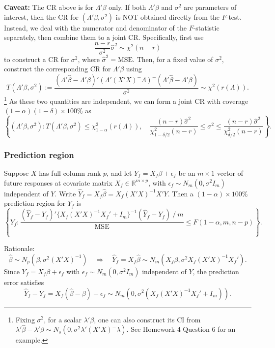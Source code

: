 \documentclass{article}
\theoremstyle{break}
\newcommand{\R}{\ensuremath{\mathbb{R}}}
\begin{document}
\textbf{Caveat:} The CR above is for $\Lambda'\beta$ only. If both $\Lambda'\beta$ and $\sigma^2$ are parameters of interest, then the CR for $(\Lambda'\beta,\sigma^2)$ is NOT obtained directly from the $F$-test. Instead, we deal with the numerator and denominator of the $F$-statistic separately, then combine them to a joint CR. 
Specifically, first use
\[
    \frac{n-r}{\sigma^2}\hat\sigma^2 \sim \chi^2(n-r)
\]
to construct a CR for $\sigma^2$, where $\hat\sigma^2=\mathrm{MSE}$. Then, for a fixed value of $\sigma^2$, construct the corresponding CR for $\Lambda'\beta$ using
\[
    T(\Lambda'\beta,\sigma^2)
    :=
    \frac{(\Lambda'\hat\beta-\Lambda'\beta)'(\Lambda'(X'X)^{-}\Lambda)^{-}(\Lambda'\hat\beta-\Lambda'\beta)}{\sigma^2}
    \sim \chi^2(r(\Lambda)).
\]
\footnote{Fixing $\sigma^2$, for a scalar $\lambda'\beta$, one can also construct its CI from $\lambda'\hat\beta - \lambda'\beta \sim N_s(0, \sigma^2 \lambda'(X'X)^- \lambda)$. See Homework 4 Question 6 for an example.}
As these two quantities are independent, we can form a joint CR with coverage $(1-\alpha)(1-\delta)\times 100\%$ as
\[
  \left\{
  (\Lambda'\beta,\sigma^2):
  T(\Lambda'\beta,\sigma^2)\leq \chi^2_{1-\alpha}(r(\Lambda)),
  \quad
  \frac{(n-r)\hat\sigma^2}{\chi^2_{1-\delta/2}(n-r)}
  \leq
  \sigma^2
  \leq
  \frac{(n-r)\hat\sigma^2}{\chi^2_{\delta/2}(n-r)}
  \right\}.
\]

\subsubsection{Prediction region}
Suppose $X$ has full column rank $p$, and let $Y_f=X_f\beta+\epsilon_f$ be an $m\times 1$ vector of future responses at covariate matrix $X_f\in \R^{m\times p}$, with $\epsilon_f\sim N_m(0,\sigma^2 I_m)$ independent of $Y$. Write $\hat Y_f=X_f\hat\beta=X_f(X'X)^{-1}X'Y$. Then a $(1-\alpha)\times 100\%$ prediction region for $Y_f$ is
\[
    \left\{
    Y_f:
    \frac{(\hat Y_f-Y_f)'\{X_f(X'X)^{-1}X_f'+I_m\}^{-1}(\hat Y_f-Y_f)\ /\ m}{\mathrm{MSE}}
    \leq F(1-\alpha,m,n-p)
    \right\}.
\]

Rationale:
\[
    \hat\beta \sim N_p(\beta, \sigma^2 (X'X)^{-1})
    \quad\Rightarrow\quad
    \hat Y_f = X_f \hat\beta \sim N_m\left(X_f \beta, \sigma^2 X_f (X'X)^{-1} X_f'\right).
\]
Since $Y_f=X_f\beta+\epsilon_f$ with $\epsilon_f\sim N_m(0,\sigma^2I_m)$ independent of $Y$, the prediction error satisfies
\[
    \hat Y_f-Y_f=X_f(\hat\beta-\beta)-\epsilon_f
    \sim N_m\left(0,\sigma^2 \left(X_f(X'X)^{-1}X_f'+I_m \right)\right).
\]
\end{document}
